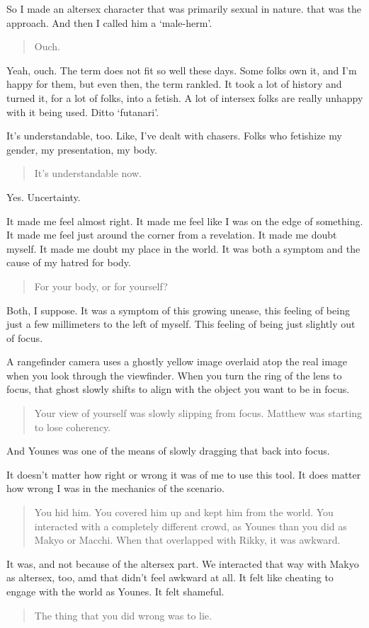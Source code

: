 So I made an altersex character that was primarily sexual in nature. that was the approach. And then I called him a `male-herm'.

\begin{quote}
Ouch.
\end{quote}

Yeah, ouch. The term does not fit so well these days. Some folks own it, and I'm happy for them, but even then, the term rankled. It took a lot of history and turned it, for a lot of folks, into a fetish. A lot of intersex folks are really unhappy with it being used. Ditto `futanari'.

It's understandable, too. Like, I've dealt with chasers. Folks who fetishize my gender, my presentation, my body.

\begin{quote}
It's understandable now.
\end{quote}

Yes. Uncertainty.

It made me feel almost right. It made me feel like I was on the edge of something. It made me feel just around the corner from a revelation. It made me doubt myself. It made me doubt my place in the world. It was both a symptom and the cause of my hatred for body.

\begin{quote}
For your body, or for yourself?
\end{quote}

Both, I suppose. It was a symptom of this growing unease, this feeling of being just a few millimeters to the left of myself. This feeling of being just slightly out of focus.

A rangefinder camera uses a ghostly yellow image overlaid atop the real image when you look through the viewfinder. When you turn the ring of the lens to focus, that ghost slowly shifts to align with the object you want to be in focus.

\begin{quote}
Your view of yourself was slowly slipping from focus. Matthew was starting to lose coherency.
\end{quote}

And Younes was one of the means of slowly dragging that back into focus.

It doesn't matter how right or wrong it was of me to use this tool. It does matter how wrong I was in the mechanics of the scenario.

\begin{quote}
You hid him. You covered him up and kept him from the world. You interacted with a completely different crowd, as Younes than you did as Makyo or Macchi. When that overlapped with Rikky, it was awkward.
\end{quote}

It was, and not because of the altersex part. We interacted that way with Makyo as altersex, too, amd that didn't feel awkward at all. It felt like cheating to engage with the world as Younes. It felt shameful.

\begin{quote}
The thing that you did wrong was to lie.
\end{quote}
